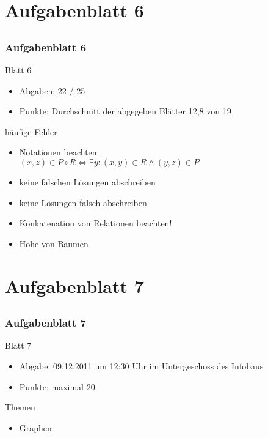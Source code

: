 

\section[Rückblick]{Aufgabenblatt 6}
\subsection*{}
\begin{frame}
	\frametitle{Aufgabenblatt 6}
	\begin{block}{Blatt 6}
		\begin{itemize}
			\item Abgaben: 22 / 25
			\item Punkte: Durchschnitt der abgegeben Blätter 12,8 von 19
		\end{itemize}
   \end{block}
	\begin{block}{häufige Fehler}
 		\begin{itemize}
 	  		\item Notationen beachten: \\
			$(x,z) \in P \circ R \Leftrightarrow \exists y: (x,y)\in R \land  (y,z)\in P$\pause
 	  		\item keine falschen Lösungen abschreiben\pause
			\item keine Lösungen falsch abschreiben\pause
      \item Konkatenation von Relationen beachten! \pause
      \item Höhe von Bäumen
 	  \end{itemize}
	\end{block}
\end{frame}

\section[Blatt 7]{Aufgabenblatt 7}
\subsection*{}
\begin{frame}
	\frametitle{Aufgabenblatt 7}
	\begin{block}{Blatt 7}
		\begin{itemize}
			\item Abgabe: 09.12.2011 um 12:30 Uhr im Untergeschoss des Infobaus
			\item Punkte: maximal 20
		\end{itemize}
  	\end{block}
	\begin{block}{Themen}
		\begin{itemize}
	  		\item Graphen
	 	\end{itemize}
	\end{block}
\end{frame}
